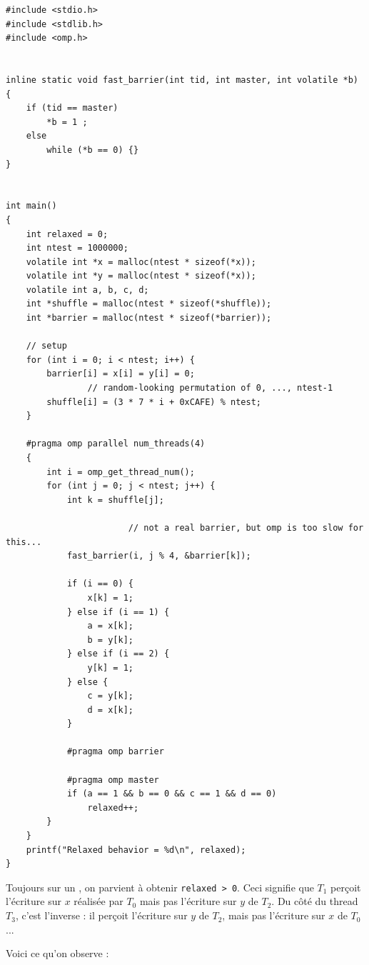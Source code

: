 \begin{myfilet}
\begin{verbatim}
#include <stdio.h>
#include <stdlib.h>
#include <omp.h>


inline static void fast_barrier(int tid, int master, int volatile *b)
{
	if (tid == master)
		*b = 1 ;
	else
		while (*b == 0) {}
}


int main()
{
	int relaxed = 0;
	int ntest = 1000000;
	volatile int *x = malloc(ntest * sizeof(*x));
	volatile int *y = malloc(ntest * sizeof(*x));
	volatile int a, b, c, d;
	int *shuffle = malloc(ntest * sizeof(*shuffle));
	int *barrier = malloc(ntest * sizeof(*barrier));

	// setup
	for (int i = 0; i < ntest; i++) {
		barrier[i] = x[i] = y[i] = 0;
                // random-looking permutation of 0, ..., ntest-1
		shuffle[i] = (3 * 7 * i + 0xCAFE) % ntest;  
	}

	#pragma omp parallel num_threads(4)
	{
		int i = omp_get_thread_num();
		for (int j = 0; j < ntest; j++) {
			int k = shuffle[j];

                        // not a real barrier, but omp is too slow for this...
			fast_barrier(i, j % 4, &barrier[k]);

			if (i == 0) {
				x[k] = 1;
			} else if (i == 1) {	
				a = x[k];
				b = y[k];
			} else if (i == 2) {	
				y[k] = 1;
			} else {
				c = y[k];
				d = x[k];
			}

			#pragma omp barrier

			#pragma omp master
			if (a == 1 && b == 0 && c == 1 && d == 0)
				relaxed++;
		}
	}
	printf("Relaxed behavior = %d\n", relaxed);
}
\end{verbatim}
\end{myfilet}

Toujours sur un , on parvient à obtenir
\texttt{relaxed > 0}. Ceci signifie que $T_1$ perçoit l'écriture sur $x$
réalisée par $T_0$ mais pas l'écriture sur $y$ de $T_2$. Du côté du thread
$T_3$, c'est l'inverse : il perçoit l'écriture sur $y$ de $T_2$, mais pas
l'écriture sur $x$ de $T_0$...

Voici ce qu'on observe :

